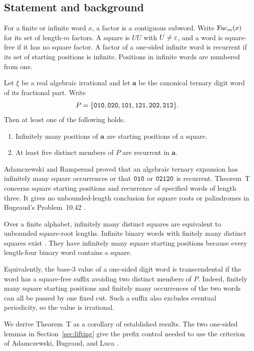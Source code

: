 \subsection{Statement and background}

For a finite or infinite word \(x\), a factor is a contiguous subword.
Write \(\operatorname{Fac}_m(x)\) for its set of length-\(m\) factors. A square is
\(UU\) with \(U\ne\varepsilon\), and a word is square-free if it has no square
factor. A factor of a one-sided infinite word is recurrent if its
set of starting positions is infinite. Positions in infinite words
are numbered from one.

\begin{theoremT}\label{thm:T}
Let \(\xi\) be a real algebraic irrational and let \(\mathbf a\) be the
canonical ternary digit word of its fractional part. Write
\[
P=\{\mathtt{010},\mathtt{020},\mathtt{101},\mathtt{121},\mathtt{202},\mathtt{212}\}.
\]
Then at least one of the following holds.
\begin{enumerate}
\item Infinitely many positions of \(\mathbf a\) are starting positions
of a square.
\item At least five distinct members of \(P\) are recurrent in
\(\mathbf a\).
\end{enumerate}
\end{theoremT}

Adamczewski and Rampersad \cite[Theorem 3.1]{AR} proved that an
algebraic ternary expansion has infinitely many square occurrences
or that \(\mathtt{010}\) or \(\mathtt{02120}\) is recurrent.
Theorem~T concerns square starting positions and recurrence of
specified words of length three. It gives no unbounded-length conclusion
for square roots or palindromes in Bugeaud's Problem~10.42 \cite{Bugeaud}.

Over a finite alphabet, infinitely many distinct squares are
equivalent to unbounded square-root lengths. Infinite binary words
with finitely many distinct squares exist \cite{BC}. They have
infinitely many square starting positions because every length-four
binary word contains a square.

Equivalently, the base-\(3\) value of a one-sided digit word is
transcendental if the word has a square-free suffix avoiding two
distinct members of \(P\). Indeed, finitely many square starting
positions and finitely many occurrences of the two words can all be
passed by one fixed cut. Such a suffix also excludes eventual
periodicity, so the value is irrational.

We derive Theorem~T as a corollary of established results. The two
one-sided lemmas in Section~\ref{sec:lifting} give the prefix control
needed to use the criterion of Adamczewski, Bugeaud, and Luca
\cite{ABL}.

